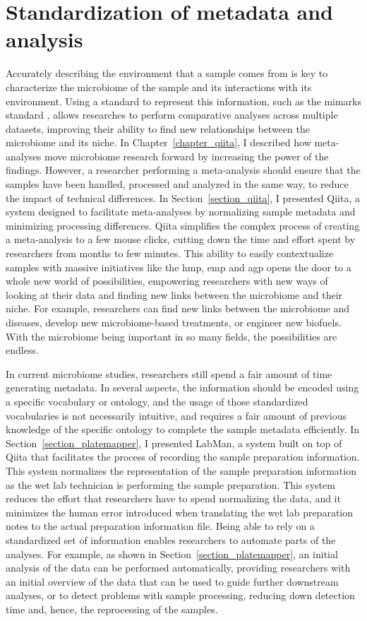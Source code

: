 \section{Standardization of metadata and analysis}

Accurately describing the environment that a sample comes from is key to characterize
the microbiome of the sample and its interactions with its environment. Using a
standard to represent this information, such as the \gls{mimarks} standard \cite{Yilmaz2011},
allows researches to perform comparative analyses across multiple datasets,
improving their ability to find new relationships between the microbiome and its
niche. In Chapter~\ref{chapter_qiita}, I described how meta-analyses move microbiome
research forward by increasing the power of the findings. However, a researcher
performing a meta-analysis should ensure that the samples have been handled,
processed and analyzed in the same way, to reduce the impact of technical
differences. In Section~\ref{section_qiita}, I presented Qiita, a system
designed to facilitate meta-analyses by normalizing sample metadata and minimizing
processing differences. Qiita simplifies the complex process of creating a
meta-analysis to a few mouse clicks, cutting down the time and effort spent by
researchers from months to few minutes. This ability to easily contextualize samples
with massive initiatives like the \gls{hmp}, \gls{emp} and \gls{agp} opens the door
to a whole new world of possibilities, empowering researchers with new ways of
looking at their data and finding new links between the microbiome and their niche.
For example, researchers can find new links between the microbiome and diseases,
develop new microbiome-based treatments, or engineer new biofuels. With the microbiome
being important in so many fields, the possibilities are endless.

In current microbiome studies, researchers still spend a fair amount of time generating
metadata. In several aspects, the information should be encoded using a specific
vocabulary or ontology, and the usage of those standardized vocabularies is not
necessarily intuitive, and requires a fair amount of previous knowledge of the
specific ontology to complete the sample metadata efficiently. In Section~\ref{section_platemapper},
I presented LabMan, a system built on top of Qiita that facilitates the
process of recording the sample preparation information. This system normalizes
the representation of the sample preparation information as the wet lab technician
is performing the sample preparation. This system reduces the effort that researchers
have to spend normalizing the data, and it minimizes the human error introduced when
translating the wet lab preparation notes to the actual preparation information
file. Being able to rely on a standardized set of information enables researchers
to automate parts of the analyses. For example, as shown in Section~\ref{section_platemapper},
an initial analysis of the data can be performed automatically, providing
researchers with an initial overview of the data that can be used to guide further
downstream analyses, or to detect problems with sample processing, reducing down
detection time and, hence, the reprocessing of the samples.

